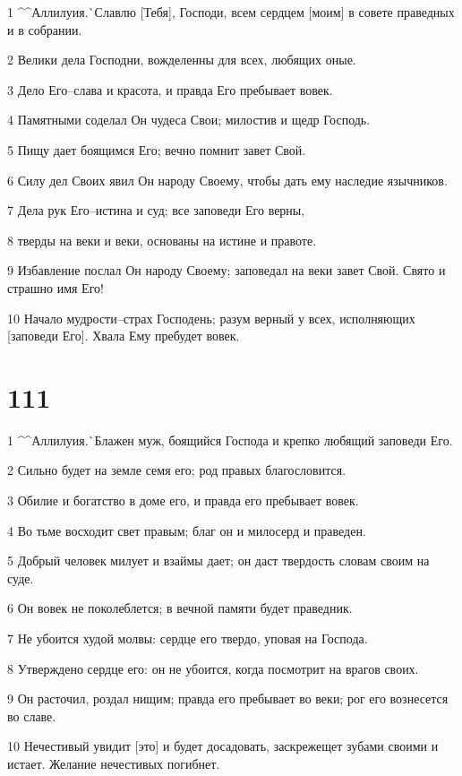 \par 1 ^^Аллилуия.^^ Славлю [Тебя], Господи, всем сердцем [моим] в совете праведных и в собрании.
\par 2 Велики дела Господни, вожделенны для всех, любящих оные.
\par 3 Дело Его--слава и красота, и правда Его пребывает вовек.
\par 4 Памятными соделал Он чудеса Свои; милостив и щедр Господь.
\par 5 Пищу дает боящимся Его; вечно помнит завет Свой.
\par 6 Силу дел Своих явил Он народу Своему, чтобы дать ему наследие язычников.
\par 7 Дела рук Его--истина и суд; все заповеди Его верны,
\par 8 тверды на веки и веки, основаны на истине и правоте.
\par 9 Избавление послал Он народу Своему; заповедал на веки завет Свой. Свято и страшно имя Его!
\par 10 Начало мудрости--страх Господень; разум верный у всех, исполняющих [заповеди Его]. Хвала Ему пребудет вовек.

\chapter{111}

\par 1 ^^Аллилуия.^^ Блажен муж, боящийся Господа и крепко любящий заповеди Его.
\par 2 Сильно будет на земле семя его; род правых благословится.
\par 3 Обилие и богатство в доме его, и правда его пребывает вовек.
\par 4 Во тьме восходит свет правым; благ он и милосерд и праведен.
\par 5 Добрый человек милует и взаймы дает; он даст твердость словам своим на суде.
\par 6 Он вовек не поколеблется; в вечной памяти будет праведник.
\par 7 Не убоится худой молвы: сердце его твердо, уповая на Господа.
\par 8 Утверждено сердце его: он не убоится, когда посмотрит на врагов своих.
\par 9 Он расточил, роздал нищим; правда его пребывает во веки; рог его вознесется во славе.
\par 10 Нечестивый увидит [это] и будет досадовать, заскрежещет зубами своими и истает. Желание нечестивых погибнет.

